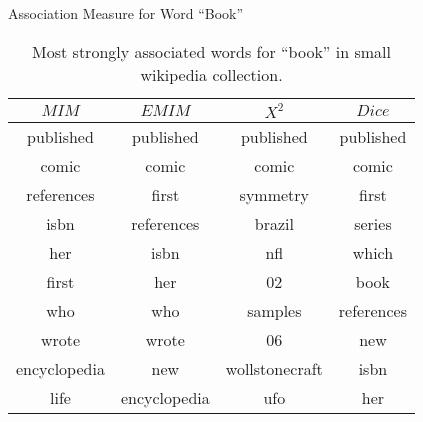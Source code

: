 \begin{table}[!htbp]
	\caption{Association Measure for Word ``Book''} \label{tab:book}
	\begin{center}
	\vspace{-5mm}
		\begin{tabular}{ c | c | c | c }
			\toprule
			$MIM$ & $EMIM$ & $X^2$ & $Dice$\\
			\midrule
published    &   published  &     published  &     published      \\
comic        &   comic      &     comic      &     comic          \\
references   &   first      &     symmetry   &     first          \\
isbn         &   references &     brazil     &     series         \\
her          &   isbn       &     nfl        &     which          \\
first        &   her        &     02         &     book           \\
who          &   who        &     samples    &     references     \\
wrote        &   wrote      &     06         &     new            \\
encyclopedia &   new        &     wollstonecraft & isbn           \\
life         &   encyclopedia  &  ufo         &    her \\
			\bottomrule
		\end{tabular}
	\caption*{\scriptsize Most strongly associated words for ``book'' in small wikipedia collection.}
	 \end{center}
\end{table}

